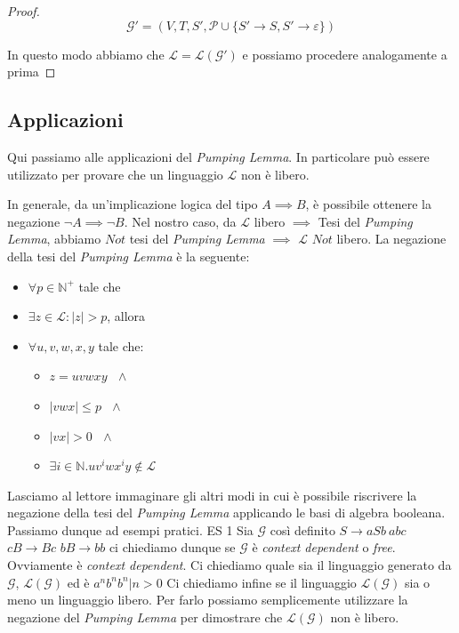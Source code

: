 \documentclass[class=book, crop=false, oneside, 12pt]{standalone}
\begin{document}
\begin{proof}
   \begin{equation*}
     \mathcal{G}' = (V, T, S', \mathcal{P} \cup \{ S' \rightarrow S, S' \rightarrow \varepsilon \})
   \end{equation*}

   In questo modo abbiamo che \(\mathcal{L} = \mathcal{L(G')}\) e possiamo procedere analogamente a prima

\end{proof}

\subsection{Applicazioni}

	Qui passiamo alle applicazioni del \emph{Pumping Lemma}. In particolare può essere utilizzato per provare che un linguaggio \(\mathcal{L}\) non è libero.

	In generale, da un'implicazione logica del tipo \(A \implies B\), è possibile ottenere la negazione \(\neg A \implies \neg B\). Nel nostro caso, da \(\mathcal{L}\) libero \(\implies\) Tesi del \emph{Pumping Lemma}, abbiamo \(Not\) tesi del \emph{Pumping Lemma} \(\implies\) \(\mathcal{L}\) \(Not\) libero.
	La negazione della tesi del \emph{Pumping Lemma} è la seguente:

	\begin{itemize}
		\item \(\forall p \in \mathbb{N}^+\) tale che
		\item \(\exists z \in \mathcal{L} : |z| > p\), allora
		\item \(\forall u, v, w, x, y\) tale che:

		\begin{itemize}
			\item \(z = uvwxy \textrm{ } \land\)
			\item \(|vwx| \leq p \textrm{ } \land\)
			\item \(|vx| > 0 \textrm{ }\land\)
			\item \(\exists i \in \mathbb{N}.uv^iwx^iy \not\in \mathcal{L}\)
		\end{itemize}

	\end{itemize}

	Lasciamo al lettore immaginare gli altri modi in cui è possibile riscrivere la negazione della tesi del \emph{Pumping Lemma} applicando le basi di algebra booleana.
	Passiamo dunque ad esempi pratici.
	ES 1
	Sia \(\mathcal{G}\) così definito
	\(S \rightarrow aSb \ abc\)
	\(cB \rightarrow Bc\)
	\(bB \rightarrow bb\)
	ci chiediamo dunque se \(\mathcal{G}\) è \emph{context dependent} o \emph{free}. Ovviamente è \emph{context dependent}.
	Ci chiediamo quale sia il linguaggio generato da \(\mathcal{G}\), \(\mathcal{L(G)}\) ed è \({a^n b^n b^n | n>0}\)
	Ci chiediamo infine se il linguaggio \(\mathcal{L(G)}\) sia o meno un linguaggio libero. Per farlo possiamo semplicemente utilizzare la negazione del \emph{Pumping Lemma} per dimostrare che \(\mathcal{L(G)}\) non è libero.
\end{document}
